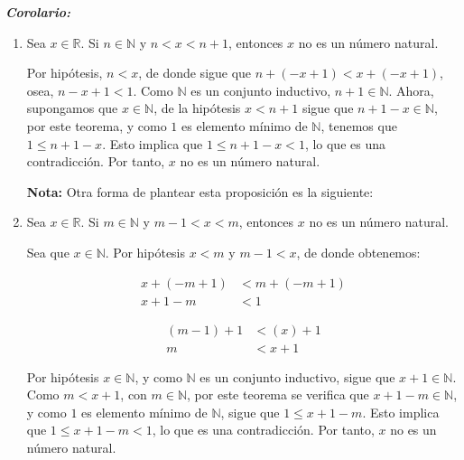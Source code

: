 \documentclass[11pt]{article}
\newcommand{\N}{\mathbb{N}}
\newcommand{\R}{\mathbb{R}}
\newcommand{\bfit}[1]{\textbf{\textit{#1}}}
\begin{document}
\begin{enumerate}[label=\alph*)]
    \bfit{Corolario:} \begin{enumerate}[label=\roman*)]
        \item Sea $x\in \R$. Si $n\in \N$ y $n<x<n+1$, entonces $x$ no es un número natural.
        
        Por hipótesis, $n<x$, de donde sigue que $n+(-x+1)<x+(-x+1)$, osea, $n-x+1<1$. Como $\N$ es un conjunto inductivo, $n+1\in \N$. Ahora, supongamos que $x\in \N$, de la hipótesis $x<n+1$ sigue que $n+1-x\in \N$, por este teorema, y como $1$ es elemento mínimo de $\N$, tenemos que $1\leq n+1-x$. Esto implica que $1\leq n+1-x < 1$, lo que es una contradicción. Por tanto, $x$ no es un número natural.

        \textbf{Nota:} Otra forma de plantear esta proposición es la siguiente:

        \item Sea $x\in \R$. Si $m\in \N$ y $m-1<x<m$, entonces $x$ no es un número natural.
        
        Sea que $x\in \N$. Por hipótesis $x<m$ y $m-1<x$, de donde obtenemos:
        \begin{center}\vspace{-1em}
            \begin{minipage}[l]{.4\linewidth}
            \begin{align*}
                x +(-m+1) &< m +(-m+1)\\
                x+1-m &< 1
            \end{align*}
            \end{minipage}%
            \begin{minipage}[r]{.4\linewidth}
            \begin{align*}
                (m-1) +1 &< (x)+1\\
                m &< x+1
            \end{align*}
            \end{minipage}
        \end{center}
        Por hipótesis $x\in \N$, y como $\N$ es un conjunto inductivo, sigue que $x+1\in \N$. Como $m<x+1$, con $m\in \N$, por este teorema se verifica que $x+1-m \in \N$, y como $1$ es elemento mínimo de $\N$, sigue que $1\leq x+1-m$. Esto implica que $1\leq x+1-m<1$, lo que es una contradicción. Por tanto, $x$ no es un número natural.


\end{enumerate}
\end{enumerate}
\end{document}
